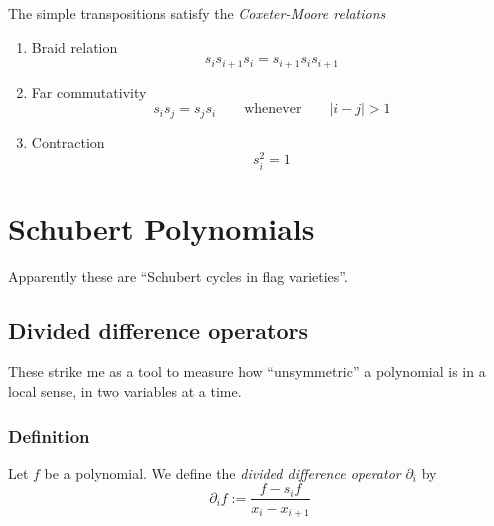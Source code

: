 \documentclass{article}
\begin{document}
\begin{theorem}\label{thm:simplecoxeterrelations}
    The simple transpositions satisfy the \textit{Coxeter-Moore relations}
    \begin{enumerate}[label=(\alph*)]
        \item Braid relation 
            \begin{equation}\label{eq:simplebraid}
                s_is_{i+1}s_i = s_{i+1}s_is_{i+1}
            \end{equation}
        \item Far commutativity
            \begin{equation}\label{eq:simplecommute}
                s_is_j = s_js_i\qquad \text{whenever}\qquad|i-j| > 1
            \end{equation}
        \item Contraction
            \begin{equation}\label{eq:simplecontract}
                s_i^2 = 1
            \end{equation}
    \end{enumerate}
\end{theorem}

\section{Schubert Polynomials}

Apparently these are ``Schubert cycles in flag varieties''.

\subsection{Divided difference operators}

These strike me as a tool to measure how ``unsymmetric'' a polynomial is in a local sense, in two variables at a time. 

\subsubsection{Definition}

\begin{definition}
    Let $f$ be a polynomial. 
    We define the \textit{divided difference operator} $\partial_i$ by 
    \begin{equation}
        \partial_i f := \frac{f-s_if}{x_i-x_{i+1}}
    \end{equation}
\end{definition}
\end{document}
